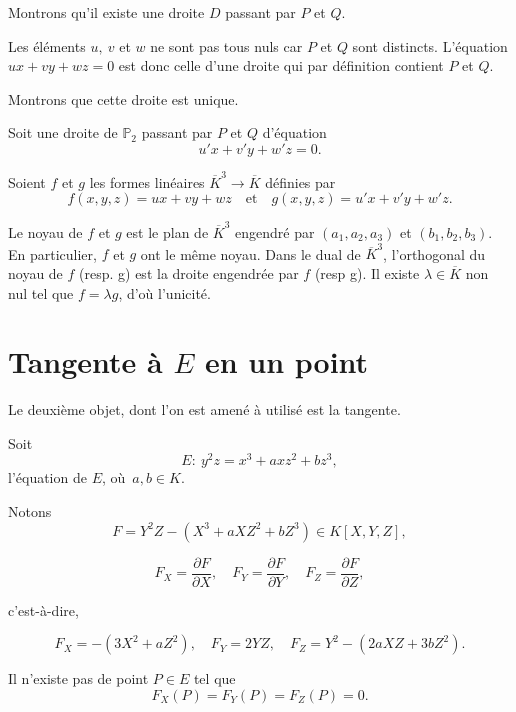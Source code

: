 \begin{demonstration}

    Montrons qu'il existe une droite $D$ passant par $P$ et $Q$.

    Les éléments $u, \ v$ et $w$ ne sont pas tous nuls car $P$ et $Q$ sont distincts.
    L'équation $ux+vy+wz =0$ est donc celle d'une droite qui par définition contient $P$ et
    $Q$.

    Montrons que cette droite est unique.

    Soit une droite de $\mathbb{P}_{2}$ passant par $P$ et $Q$ d'équation
    \[
    u'x+v'y+w'z = 0 
    .\] 

    Soient $f$ et $g$ les formes linéaires $\overline{K}^3 \to \overline{K}$ définies par 
    \[
    f(x,y,z) = ux + vy + wz \quad \text{et} \quad g(x,y,z) = u'x+v'y+w'z
    .\] 

    Le noyau de $f$ et $g$ est le plan de $\overline{K}^3$ engendré par $\left( a_1,a_2,a_3
    \right) $ et $\left( b_1,b_2,b_3 \right) $. En particulier, $f$ et $g$ ont le
    même noyau. Dans le dual de $\overline{K}^3$, l'orthogonal du noyau de $f$ 
    (resp. g) est la droite engendrée par $f$ (resp g). Il existe $\lambda \in
    \overline{K}$ non nul tel que $f = \lambda g$, d'où l'unicité.
\end{demonstration}

\section{Tangente à $E$ en un point}

Le deuxième objet, dont l'on est amené à utilisé est la tangente.

Soit 
\[
E:\ y^2z = x^3 + axz^2 + bz^3
,\] l'équation de $E$, où $a,b \in K$.

Notons
\[
    F = Y^2Z - \left( X^3 + aXZ^2 + bZ^3 \right) \in K[X,Y,Z]
,\] 

\[
F_{X} = \frac{\partial F}{\partial X},\quad F_{Y} = \frac{\partial F}{\partial Y},\quad F_{Z} = \frac{\partial F}{\partial Z}
,\] 

c'est-à-dire, 

\[
F_{X} = - \left( 3X^2 + aZ^2 \right),\quad F_{Y} = 2YZ,\quad F_{Z} = Y^2 - \left( 2aXZ + 3bZ^2 \right)
.\] 

\begin{lemme}
    \label{lem:lemme3}
    
    Il n'existe pas de point $P \in E$ tel que
    \[
    F_{X}(P) = F_{Y}(P) = F_{Z}(P) = 0
    .\] 
\end{lemme}

